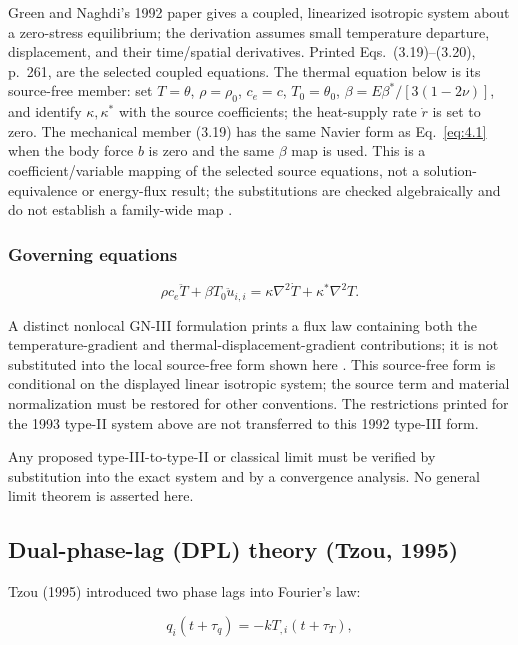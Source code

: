 Green and Naghdi's 1992 paper gives a coupled, linearized isotropic system about a zero-stress equilibrium; the derivation assumes small temperature departure, displacement, and their time/spatial derivatives. Printed Eqs.~(3.19)--(3.20), p.~261, are the selected coupled equations. The thermal equation below is its source-free member: set $T=\theta$, $\rho=\rho_0$, $c_e=c$, $T_0=\theta_0$, $\beta=E\beta^*/[3(1-2\nu)]$, and identify $\kappa,\kappa^*$ with the source coefficients; the heat-supply rate $\dot r$ is set to zero. The mechanical member (3.19) has the same Navier form as Eq.~\eqref{eq:4.1} when the body force $b$ is zero and the same $\beta$ map is used. This is a coefficient/variable mapping of the selected source equations, not a solution-equivalence or energy-flux result; the substitutions are checked algebraically and do not establish a family-wide map \cite{GreenGN1992}.

\subsubsection{Governing equations}

\begin{equation}
\rho c_e\ddot{T} + \beta T_0\ddot{u}_{i,i} = \kappa\nabla^2\dot{T} + \kappa^*\nabla^2 T.
\label{eq:4.14}
\end{equation}

A distinct nonlocal GN-III formulation prints a flux law containing both the temperature-gradient and thermal-displacement-gradient contributions; it is not substituted into the local source-free form shown here \cite{Biswas2020a}. This source-free form is conditional on the displayed linear isotropic system; the source term and material normalization must be restored for other conventions. The restrictions printed for the 1993 type-II system above are not transferred to this 1992 type-III form.

Any proposed type-III-to-type-II or classical limit must be verified by substitution into the exact system and by a convergence analysis. No general limit theorem is asserted here.

\subsection{Dual-phase-lag (DPL) theory (Tzou, 1995)}
\label{sec:4.7}

Tzou (1995) introduced two phase lags into Fourier's law:

\begin{equation}
q_i(t + \tau_q) = -k T_{,i}(t + \tau_T),
\label{eq:4.15}
\end{equation}

